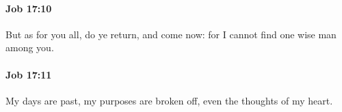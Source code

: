 		\paragraph{Job 17:10} %
			\label{JOB-17-10}

			But as for you all, do ye return, and come now: for I cannot find one wise man among you.


		\paragraph{Job 17:11} %
			\label{JOB-17-11}

			My days are past, my purposes are broken off, even the thoughts of my heart.



